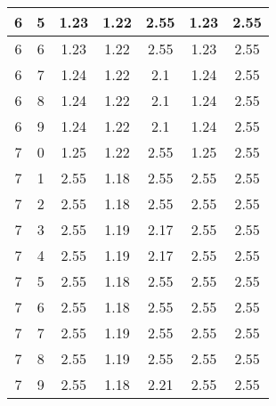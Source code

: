 \begin{longtable}{|c|c||c||c|c||c|c|}
	6 & 5 & 1.23 & 1.22 & 2.55 & 1.23 & 2.55 \\ \hline
	6 & 6 & 1.23 & 1.22 & 2.55 & 1.23 & 2.55 \\ \hline
	6 & 7 & 1.24 & 1.22 & 2.1 & 1.24 & 2.55 \\ \hline
	6 & 8 & 1.24 & 1.22 & 2.1 & 1.24 & 2.55 \\ \hline
	6 & 9 & 1.24 & 1.22 & 2.1 & 1.24 & 2.55 \\ \hline
	7 & 0 & 1.25 & 1.22 & 2.55 & 1.25 & 2.55 \\ \hline
	7 & 1 & 2.55 & 1.18 & 2.55 & 2.55 & 2.55 \\ \hline
	7 & 2 & 2.55 & 1.18 & 2.55 & 2.55 & 2.55 \\ \hline
	7 & 3 & 2.55 & 1.19 & 2.17 & 2.55 & 2.55 \\ \hline
	7 & 4 & 2.55 & 1.19 & 2.17 & 2.55 & 2.55 \\ \hline
	7 & 5 & 2.55 & 1.18 & 2.55 & 2.55 & 2.55 \\ \hline
	7 & 6 & 2.55 & 1.18 & 2.55 & 2.55 & 2.55 \\ \hline
	7 & 7 & 2.55 & 1.19 & 2.55 & 2.55 & 2.55 \\ \hline
	7 & 8 & 2.55 & 1.19 & 2.55 & 2.55 & 2.55 \\ \hline
	7 & 9 & 2.55 & 1.18 & 2.21 & 2.55 & 2.55 \\ \hline
\end{longtable}

